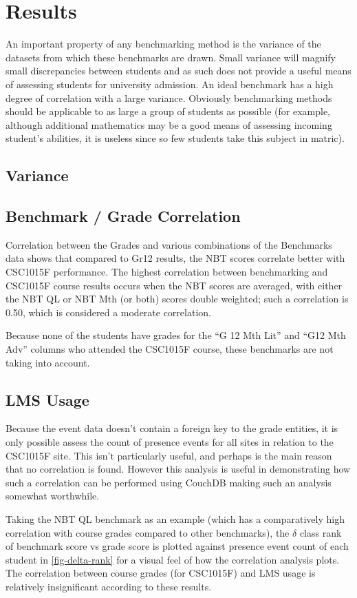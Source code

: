 \section{Results}
An important property of any benchmarking method is the variance of the datasets from which these benchmarks are drawn. Small variance will magnify small discrepancies between students and as such does not provide a useful means of assessing students for university admission. An ideal benchmark has a high degree of correlation with a large variance. Obviously benchmarking methods should be applicable to as large a group of students as possible (for example, although additional mathematics may be a good means of assessing incoming student's abilities, it is useless since so few students take this subject in matric).

\subsection{Variance}

\subsection{Benchmark / Grade Correlation}
Correlation between the Grades and various combinations of the Benchmarks data shows that compared to Gr12 results, the NBT scores correlate better with CSC1015F performance. The highest correlation between benchmarking and CSC1015F course results occurs when the NBT scores are averaged, with either the NBT QL or NBT Mth (or both) scores double weighted; such a correlation is 0.50, which is considered a moderate correlation.

Because none of the students have grades for the ``G 12 Mth Lit'' and ``G12 Mth Adv'' columns who attended the CSC1015F course, these benchmarks are not taking into account.

\subsection{LMS Usage}
Because the event data doesn't contain a foreign key to the grade entities, it is only possible assess the count of presence events for all sites in relation to the CSC1015F site. This isn't particularly useful, and perhaps is the main reason that no correlation is found. However this analysis is useful in demonstrating how such a correlation can be performed using CouchDB making such an analysis somewhat worthwhile.


Taking the NBT QL benchmark as an example (which has a comparatively high correlation with course grades compared to other benchmarks), the \( \delta \) class rank of benchmark score vs grade score is plotted against presence event count of each student in \ref{fig-delta-rank} for a visual feel of how the correlation analysis plots. The correlation between course grades (for CSC1015F) and LMS usage is relatively insignificant according to these results.

